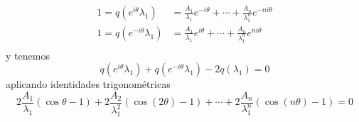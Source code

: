 \begin{enumerate}[1)]
\begin{enumerate}[i]
\begin{align*}
            1 = q(e^{i\theta}\lambda_1) &= \frac{A_1}{\lambda_1}e^{-i\theta} + \cdots + \frac{A_n}{\lambda_1^n}e^{-ni\theta}\\
            1 = q(e^{-i\theta}\lambda_1) &= \frac{A_1}{\lambda_1}e^{i\theta} + \cdots + \frac{A_n}{\lambda_1^n}e^{ni\theta}\\
        \end{align*}
        y tenemos
        $$
            q(e^{i\theta}\lambda_1) + q(e^{-i\theta}\lambda_1) - 2q(\lambda_1) = 0
        $$
        aplicando identidades trigonométricas
        $$
            2 \frac{A_1}{\lambda_1}(\cos \theta - 1) + 2 \frac{A_2}{\lambda_1^2}(\cos(2\theta) - 1) + \cdots + 2 \frac{A_n}{\lambda_1^n}(\cos(n\theta) - 1) = 0
        $$
    \end{enumerate}
\end{enumerate}
